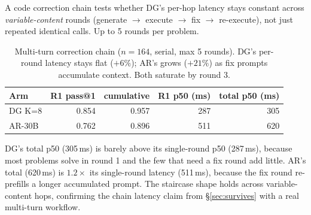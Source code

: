A code correction chain tests whether DG's per-hop latency stays
constant across \emph{variable-content} rounds (generate $\to$ execute
$\to$ fix $\to$ re-execute), not just repeated identical calls. Up to
5 rounds per problem.

\begin{table}[h]
\centering
\caption{Multi-turn correction chain ($n{=}164$, serial, max 5 rounds).
DG's per-round latency stays flat ($+6\%$); AR's grows ($+21\%$) as
fix prompts accumulate context. Both saturate by round 3.}
\label{tab:chain}
\begin{tabular}{@{}lrrrr@{}}
\toprule
Arm & R1 pass@1 & cumulative & R1 p50 (ms) & total p50 (ms) \\
\midrule
DG K=8  & 0.854 & 0.957 & 287 & 305 \\
AR-30B  & 0.762 & 0.896 & 511 & 620 \\
\bottomrule
\end{tabular}
\end{table}

DG's total p50 (305\,ms) is barely above its single-round p50
(287\,ms), because most problems solve in round 1 and the few that
need a fix round add little. AR's total (620\,ms) is $1.2\times$ its
single-round latency (511\,ms), because the fix round re-prefills a
longer accumulated prompt. The staircase shape holds across
variable-content hops, confirming the chain latency claim from
\S\ref{sec:survives} with a real multi-turn workflow.
